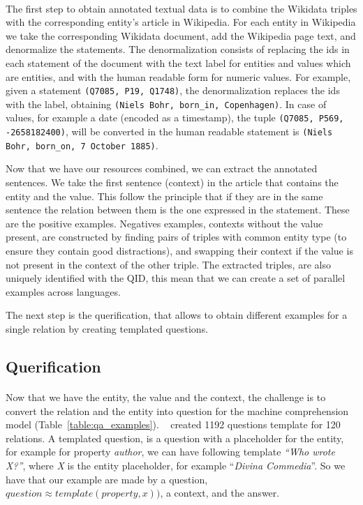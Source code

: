 \paragraph{}
The first step to obtain annotated textual data is to combine the Wikidata triples with the corresponding entity's article in Wikipedia. For each entity in Wikipedia we  take  the  corresponding  Wikidata  document, add  the  Wikipedia  page  text,  and  denormalize the  statements. The denormalization consists  of  replacing  the ids in  each  statement  of  the document with the text label for entities and values which are entities,  and  with  the  human  readable  form  for numeric values. For example, given a statement \texttt{(Q7085, P19, Q1748)}, the denormalization replaces the ids with the label, obtaining \texttt{(Niels Bohr, born\_in, Copenhagen)}. In case of values, for example a date (encoded as a timestamp), the tuple \texttt{(Q7085, P569, -2658182400)}, will be converted in the human readable statement is \texttt{(Niels Bohr, born\_on, 7 October 1885)}. 

Now that we have our resources combined, we can extract the annotated sentences. We take the first sentence (context) in the article that contains the entity and the value. This follow the principle that if they are in the same sentence the relation between them is the one expressed in the statement. These are the positive examples. Negatives examples, contexts without the value present, are constructed by finding pairs of triples with common entity type (to ensure they contain good distractions), and swapping their context if the value is not present in the context of the other triple. The extracted triples, are also uniquely identified with the QID, this mean that we can create a set of parallel examples across languages. 

The next step is the querification, that allows to obtain different examples for a single relation by creating templated questions.

\newpage
\subsection{Querification}
\paragraph{}
Now that we have the entity, the value and the context, the challenge is to convert the relation and the entity into question for the machine comprehension model (Table~\ref{table:qa_examples}). ~\cite{levy2017zero} created 1192 questions template for 120 relations. A templated question, is a question with a placeholder for the entity, for example for property \textit{author}, we can have following template \textit{``Who wrote X?''}, where \textit{X} is the entity placeholder, for example ``\textit{Divina Commedia}''. So we have that our example are made by a question,  $question \approx template(property,x))$, a context, and the answer. 

